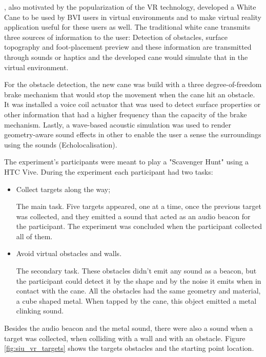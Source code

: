 \citeauthor{siu2020virtual}, also motivated by the popularization of the VR technology, developed a White Cane to be used by BVI users in virtual environments and to make virtual reality application useful for these users as well. The traditional white cane transmits three sources of information to the user: Detection of obstacles, surface topography and foot-placement preview and these information are transmitted through sounds or haptics \cite{siu2020virtual} and the developed cane would simulate that in the virtual environment.

For the obstacle detection, the new cane was build with a three degree-of-freedom brake mechanism that would stop the movement when the cane hit an obstacle. It was installed a voice coil actuator that was used to detect surface properties or other information that had a higher frequency than the capacity of the brake mechanism. Lastly, a wave-based acoustic simulation was used to render geometry-aware sound effects in other to enable the user a sense the surroundings using the sounds (Echolocalisation).

The experiment's participants were meant to play a "Scavenger Hunt" using a HTC Vive. During the experiment each participant had two tasks:

\begin{itemize}
    \item Collect targets along the way;
    
    The main task. Five targets appeared, one at a time, once the previous target was collected, and they emitted a sound that acted as an audio beacon for the participant. The experiment was concluded when the participant collected all of them.
    
    \item Avoid virtual obstacles and walls.
    
    The secondary task. These obstacles didn't emit any sound as a beacon, but the participant could detect it by the shape and by the noise it emits when in contact with the cane. All the obstacles had the same geometry and material, a cube shaped metal. When tapped by the cane, this object emitted a metal clinking sound.
\end{itemize}

Besides the audio beacon and the metal sound, there were also a sound when a target was collected, when colliding with a wall and with an obstacle. Figure \ref{fig:siu_vr_targets} shows the targets obstacles and the starting point location.

